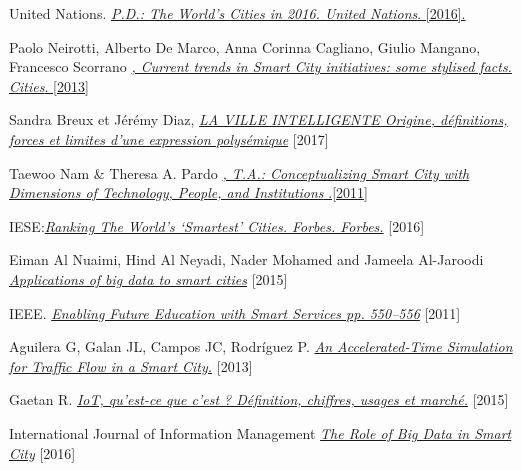 \documentclass[french, a4paper, 12pt]{report}
\begin{document}
% 
%  
{} 
\begin{thebibliography}{9}
United Nations. \href{https://www.un.org/en/development/desa/population/publications/pdf/urbanization/the_worlds_cities_in_2016_data_booklet.pdf}{\emph{P.D.: The World’s Cities in 2016. United Nations}. [2016].} 

 Paolo Neirotti, Alberto De Marco, Anna Corinna Cagliano, Giulio Mangano, Francesco Scorrano \href{https://www.researchgate.net/publication/260015335_Current_trends_in_Smart_City_initiatives_Some_stylised_facts}{\emph{, Current trends in Smart City initiatives: some stylised facts. Cities}. [2013]} 

  Sandra Breux et Jérémy Diaz, \href{http://espace.inrs.ca/4917/1/Rapport-LaVilleIntelligente.pdf}{\emph{LA VILLE INTELLIGENTE Origine, définitions, forces et limites d’une expression polysémique}} [2017]

 Taewoo Nam \& Theresa A. Pardo \href{https://inta-aivn.org/images/cc/Urbanism/background\%20documents/dgo_2011_smartcity.pdf}{\emph{, T.A.: Conceptualizing Smart City with Dimensions of Technology, People, and Institutions }.[2011]} 


IESE:\href{https://www.forbes.com/sites/iese/2019/05/21/these-are-the-smartest-cities-in-the-world-for-2019/}{\emph{Ranking The World’s ‘Smartest’ Cities. Forbes. Forbes.}} [2016]

Eiman Al Nuaimi, Hind Al Neyadi, Nader Mohamed and Jameela Al-Jaroodi \href{https://jisajournal.springeropen.com/articles/10.1186/s13174-015-0041-5}{\emph{Applications of big data to smart cities}} [2015]

IEEE. \href{https://ieeexplore.ieee.org/abstract/document/5958132}{\emph{Enabling Future Education with Smart Services pp. 550–556}} [2011]

Aguilera G, Galan JL, Campos JC, Rodríguez P. \href{https://www.sciencedirect.com/science/article/pii/S0377042713006523}{\emph{An Accelerated-Time Simulation for Traffic Flow in a Smart City.}} [2013]

Gaetan R. \href{https://www.objetconnecte.com/iot-definition-chiffres-usages-marches/}{\emph{IoT, qu’est-ce que c’est ? Définition, chiffres, usages et marché.}} [2015]


International Journal of Information Management \href{https://www.researchgate.net/publication/301803005_The_Role_of_Big_Data_in_Smart_City}{\emph{The Role of Big Data in Smart City}} [2016]


\end{thebibliography}
\end{document}
